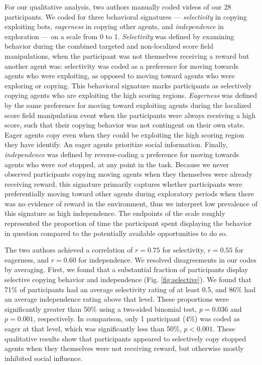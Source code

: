 \documentclass[12pt,letterpaper]{article}
\begin{document}
For our qualitative analysis, two authors manually coded videos of our 28 participants. We coded for three behavioral signatures --- \emph{selectivity} in copying exploiting bots, \emph{eagerness} in copying other agents, and \emph{independence} in exploration --- on a scale from 0 to 1. \emph{Selectivity} was defined by examining behavior during the combined targeted and non-localized score field manipulations, when the participant was not themselves receiving a reward but another agent was: selectivity was coded as a preference for moving towards agents who were exploiting, as opposed to moving toward agents who were exploring or copying. This behavioral signature marks participants as selectively copying agents who are exploiting the high scoring regions.
\emph{Eagerness} was defined by the same preference for moving toward exploiting agents during the localized score field manipulation event when the participants were always receiving a high score, such that their copying behavior was not contingent on their own state. Eager agents copy even when they could be exploiting the high scoring region they have identify. An eager agents prioritize social information.
Finally, \emph{independence} was defined by reverse-coding a preference for moving towards agents who were \emph{not} stopped, at any point in the task. Because we never observed participants copying moving agents when they themselves were already receiving reward, this signature primarily captures whether participants were preferentially moving toward other agents during exploratory periods when there was no evidence of reward in the environment, thus we interpret low prevalence of this signature as high independence. 
The endpoints of the scale roughly represented the proportion of time the participant spent displaying the behavior in question compared to the potentially available opportunities to do so. 

The two authors achieved a correlation of $r = 0.75$ for selectivity, $r = 0.55$ for eagerness, and $r = 0.60$ for independence. We resolved disagreements in our codes by averaging. 
First, we found that a substantial fraction of participants display selective copying behavior and independence (Fig. \ref{fig:selective}). 
We found that 71\% of participants had an average selectivity rating of at least 0.5, and 86\% had an average independence rating above that level. 
These proportions were significantly greater than 50\% using a two-sided binomial test, $p = 0.036$ and $p = 0.001$, respectively.  
In comparison, only 1 participant (4\%) was coded as eager at that level, which was significantly less than 50\%, $p < 0.001$.
These qualitative results show that participants appeared to selectively copy stopped agents when they themselves were not receiving reward, but otherwise mostly inhibited social influence.
\end{document}
